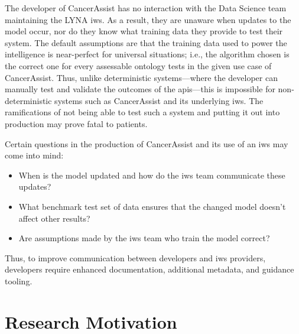 The developer of CancerAssist has no interaction with the Data Science team maintaining the LYNA \gls{iws}. As a result, they are unaware when updates to the model occur, nor do they know what training data they provide to test their system. The default assumptions are that the training data used to power the intelligence is near-perfect for universal situations; i.e., the algorithm chosen is the correct one for every assessable ontology tests in the given use case of CancerAssist. Thus, unlike deterministic systems---where the developer can manually test and validate the outcomes of the \glspl{api}---this is impossible for non-deterministic systems such as CancerAssist and its underlying \gls{iws}. The ramifications of not being able to test such a system and putting it out into production may prove fatal to patients.

Certain questions in the production of CancerAssist and its use of an \gls{iws} may come into mind:

\begin{itemize}%
  \item When is the model updated and how do the \gls{iws} team communicate these updates?
  \item What benchmark test set of data ensures that the changed model doesn't affect other results?
  \item Are assumptions made by the \gls{iws} team who train the model correct?
\end{itemize}

Thus, to improve communication between developers and \gls{iws} providers, developers require enhanced documentation, additional metadata, and guidance tooling. 

\section{Research Motivation}%
\label{sec:introduction:motivation}

 


